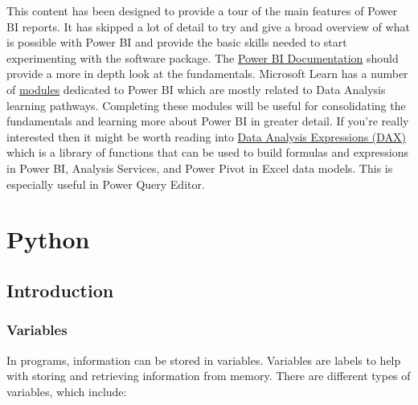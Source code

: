 \documentclass[
]{book}
\begin{document}
This content has been designed to provide a tour of the main features of Power BI reports. It has skipped a lot of detail to try and give a broad overview of what is possible with Power BI and provide the basic skills needed to start experimenting with the software package. The \href{https://docs.microsoft.com/en-us/power-bi/fundamentals/}{Power BI Documentation} should provide a more in depth look at the fundamentals. Microsoft Learn has a number of \href{https://docs.microsoft.com/en-us/learn/modules/get-started-with-power-bi/}{modules} dedicated to Power BI which are mostly related to Data Analysis learning pathways. Completing these modules will be useful for consolidating the fundamentals and learning more about Power BI in greater detail. If you're really interested then it might be worth reading into \href{https://docs.microsoft.com/en-us/dax/}{Data Analysis Expressions (DAX)} which is a library of functions that can be used to build formulas and expressions in Power BI, Analysis Services, and Power Pivot in Excel data models. This is especially useful in Power Query Editor.

\hypertarget{python}{%
\chapter{Python}\label{python}}

\hypertarget{introduction-1}{%
\section{Introduction}\label{introduction-1}}

\hypertarget{variables}{%
\subsection{Variables}\label{variables}}

In programs, information can be stored in variables. Variables are labels to help with storing and retrieving information from memory. There are different types of variables, which include:
\end{document}
